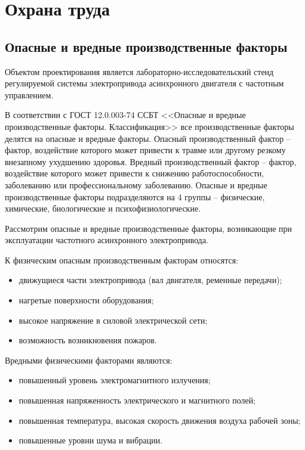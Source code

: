 \section{Охрана труда}
    \subsection{Опасные и вредные производственные факторы}
        Объектом проектирования является лабораторно-исследовательский 
        стенд регулируемой системы электропривода асинхронного двигателя с
        частотным управлением.

        В соответствии с ГОСТ 12.0.003-74 ССБТ <<Опасные и вредные
        производственные факторы.  Классификация>> все производственные факторы
        делятся на опасные и вредные факторы. Опасный производственный фактор –
        фактор, воздействие которого может привести к травме или другому
        резкому внезапному ухудшению здоровья. Вредный производственный фактор
        – фактор, воздействие которого может привести к снижению
        работоспособности, заболеванию или профессиональному заболеванию.
        Опасные и вредные производственные факторы подразделяются на 4 группы --
        физические, химические, биологические и психофизиологические. 

        Рассмотрим опасные и вредные производственные факторы, возникающие при
        эксплуатации частотного асинхронного электропривода.

        К физическим опасным производственным факторам относятся:
        \begin{itemize}
            \item движущиеся части электропривода  (вал двигателя, ременные
                передачи);
            \item нагретые поверхности оборудования;
            \item высокое напряжение в силовой электрической сети; 
            \item возможность возникновения пожаров.
        \end{itemize}

       Вредными физическими факторами являются:
        \begin{itemize}
            \item повышенный уровень электромагнитного излучения;
            \item повышенная напряженность электрического и магнитного полей;
            \item повышенная температура, высокая скорость движения воздуха
                рабочей зоны;
            \item повышенные уровни шума и вибрации.
        \end{itemize}

